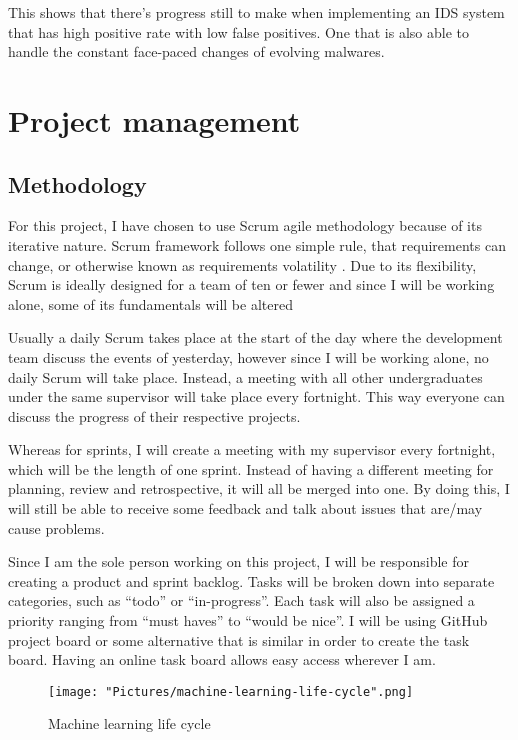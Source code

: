 \documentclass[11pt]{article}
\begin{document}
This shows that there’s progress still to make when implementing an IDS system that has high positive rate with low false positives. One that is also able to handle the constant face-paced changes of evolving malwares.

\newpage
\section{Project management}
\subsection{Methodology}
For this project, I have chosen to use Scrum agile methodology because of its iterative nature. Scrum framework follows one simple rule, that requirements can change, or otherwise known as requirements volatility \cite{methodology-requirement-volatile}. Due to its flexibility, Scrum is ideally designed for a team of ten or fewer \cite{methodology-ten-fewer} and since I will be working alone, some of its fundamentals will be altered

Usually a daily Scrum takes place at the start of the day where the development team discuss the events of yesterday, however since I will be working alone, no daily Scrum will take place. Instead, a meeting with all other undergraduates under the same supervisor will take place every fortnight. This way everyone can discuss the progress of their respective projects.

Whereas for sprints, I will create a meeting with my supervisor every fortnight, which will be the length of one sprint. Instead of having a different meeting for planning, review and retrospective, it will all be merged into one. By doing this, I will still be able to receive some feedback and talk about issues that are/may cause problems.

Since I am the sole person working on this project, I will be responsible for creating a product and sprint backlog. Tasks will be broken down into separate categories, such as “todo” or “in-progress”. Each task will also be assigned a priority ranging from “must haves” to “would be nice”. I will be using GitHub project board \cite{methodology-github-projects} or some alternative that is similar in order to create the task board. Having an online task board allows easy access wherever I am. 

\begin{figure}[h!]
   \texttt{[image: "Pictures/machine-learning-life-cycle".png]}
   \caption{Machine learning life cycle}
   \label{fig:ml-life-cycle}
\end{figure}
\end{document}
